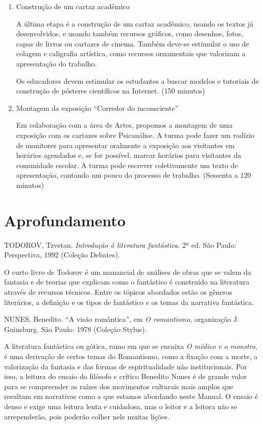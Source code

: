 \documentclass[12pt]{extarticle}
\begin{document}
{\begin{enumerate}
\item
Construção de um cartaz acadêmico

A última etapa é a construção de um cartaz acadêmico, usando os textos
já desenvolvidos, e usando também recursos gráficos, como desenhos,
fotos, capas de livros ou cartazes de cinema. Também deve-se estimular o
uso de colagem e caligrafia artística, como recursos ornamentais que
valorizam a apresentação do trabalho.

Os educadores devem estimular os estudantes a buscar modelos e tutoriais
de construção de pôsteres científicos na Internet. (150 minutos)

\item
Montagem da exposição ``Corredor do inconsciente''

Em colaboração com a área de Artes, propomos a montagem de uma exposição
com os cartazes sobre Psicanálise. A turma pode fazer um rodízio de
monitores para apresentar oralmente a exposição aos visitantes em
horários agendados e, se for possível, marcar horários para visitantes
da comunidade escolar. A turma pode escrever coletivamente um texto de
apresentação, contando um pouco do processo de trabalho. (Sessenta a 120
minutos)
\end{enumerate}

\section{Aprofundamento}

TODOROV, Tzvetan. \emph{Introdução à literatura fantástica}. 2ª ed. São
Paulo: Perspectiva, 1992 (Coleção Debates).

O curto livro de Todorov é um manancial de análises de obras que se
valem da fantasia e de teorias que explicam como o fantástico é
construído na literatura através de recursos técnicos. Entre os tópicos
abordados estão os gêneros literários, a definição e os tipos de
fantástico e os temas da narrativa fantástica.

NUNES, Benedito. ``A visão romântica'', em \emph{O romantismo},
organização J. Guinsburg. São Paulo: 1978 (Coleção Stylus).

A literatura fantástica ou gótica, ramo em que se encaixa \emph{O médico
e o monstro}, é uma derivação de certos temas do Romantismo, como a
fixação com a morte, a valorização da fantasia e das formas de
espiritualidade não institucionais. Por isso, a leitura do ensaio do
filósofo e crítico Benedito Nunes é de grande valor para se compreender
as raízes dos movimentos culturais mais amplos que resultam em
narrativas como a que estamos abordando neste Manual. O ensaio é denso e
exige uma leitura lenta e cuidadosa, mas o leitor e a leitora não se
arrependerão, pois poderão colher nele muitas lições.

}
\end{document}
